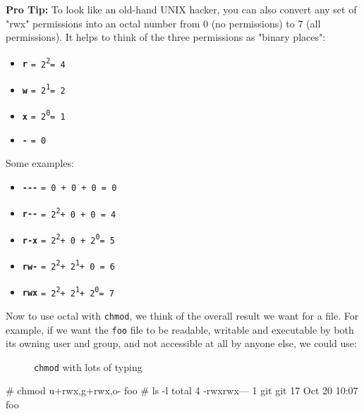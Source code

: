 \documentclass[10pt,american,]{book}
\newenvironment{Shaded}{\begin{snugshade}}{\end{snugshade}}
\newcommand{\KeywordTok}[1]{\textcolor[rgb]{0.13,0.29,0.53}{\textbf{{#1}}}}
\newcommand{\CommentTok}[1]{\textcolor[rgb]{0.56,0.35,0.01}{\textit{{#1}}}}
\newcommand{\NormalTok}[1]{{#1}}
\providecommand{\tightlist}{%
  \setlength{\itemsep}{0pt}\setlength{\parskip}{0pt}}
\numberwithin{figure}{chapter}
\DeclareRobustCommand{\drcap}[1]{\begin{figure}[H]\caption{#1}\end{figure}}
\renewcommand{\KeywordTok}[1]{{#1}}
\renewcommand{\CommentTok}[1]{{#1}}
\renewcommand{\NormalTok}[1]{{#1}}
\begin{document}
\textbf{Pro Tip:} To look like an old-hand UNIX hacker, you can also
convert any set of "rwx" permissions into an octal number from 0 (no
permissions) to 7 (all permissions). It helps to think of the three
permissions as "binary places":

\begin{itemize}
\tightlist
\item
  \textbf{\texttt{r}}
  \texttt{=\ 2}\textsuperscript{\texttt{2}}\texttt{=\ 4}
\item
  \textbf{\texttt{w}}
  \texttt{=\ 2}\textsuperscript{\texttt{1}}\texttt{=\ 2}
\item
  \textbf{\texttt{x}}
  \texttt{=\ 2}\textsuperscript{\texttt{0}}\texttt{=\ 1}
\item
  \textbf{\texttt{-}} \texttt{=\ 0}
\end{itemize}

Some examples:

\begin{itemize}
\tightlist
\item
  \textbf{\texttt{-\/-\/-}} \texttt{=\ 0\ +\ 0\ +\ 0\ =\ 0}
\item
  \textbf{\texttt{r-\/-}}
  \texttt{=\ 2}\textsuperscript{\texttt{2}}\texttt{+\ 0\ +\ 0\ =\ 4}
\item
  \textbf{\texttt{r-x}}
  \texttt{=\ 2}\textsuperscript{\texttt{2}}\texttt{+\ 0\ +\ 2}\textsuperscript{\texttt{0}}\texttt{=\ 5}
\item
  \textbf{\texttt{rw-}}
  \texttt{=\ 2}\textsuperscript{\texttt{2}}\texttt{+\ 2}\textsuperscript{\texttt{1}}\texttt{+\ 0\ =\ 6}
\item
  \textbf{\texttt{rwx}}
  \texttt{=\ 2}\textsuperscript{\texttt{2}}\texttt{+\ 2}\textsuperscript{\texttt{1}}\texttt{+\ 2}\textsuperscript{\texttt{0}}\texttt{=\ 7}
\end{itemize}

Now to use octal with \texttt{chmod}, we think of the overall result we
want for a file. For example, if we want the \texttt{foo} file to be
readable, writable and executable by both its owning user and group, and
not accessible at all by anyone else, we could use:

\drcap{\texttt{chmod} with lots of typing}

\begin{Shaded}
\begin{Highlighting}[]
\CommentTok{# chmod u+rwx,g+rwx,o- foo}
\CommentTok{# ls -l}
\KeywordTok{total} \NormalTok{4}
\KeywordTok{-rwxrwx---} \NormalTok{1 git git 17 Oct 20 10:07 foo}
\end{Highlighting}
\end{Shaded}
\end{document}

